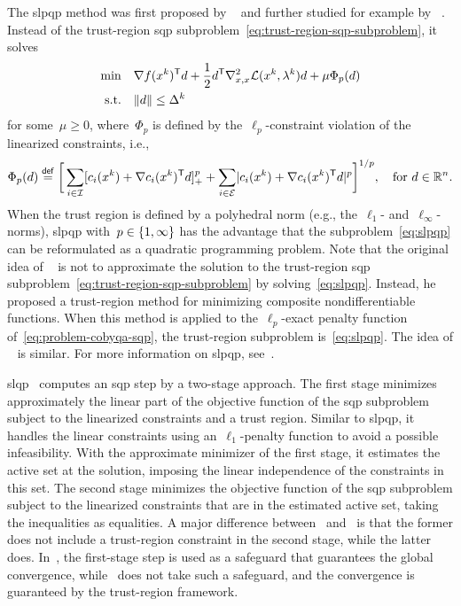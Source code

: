 The \gls{slpqp} method was first proposed by \citeauthor{Fletcher_1982a}~\cite{Fletcher_1982a} and further studied for example by \citeauthor{Yuan_1995}~\cite{Yuan_1995}.
Instead of the trust-region \gls{sqp} subproblem~\cref{eq:trust-region-sqp-subproblem}, it solves
\begin{subequations}
    \label{eq:slpqp}
    \begin{align}
        \min        & \quad \nabla \obj(\iter[k])^{\T} \step + \frac{1}{2} \step^{\T} \nabla_{x, x}^2 \lag(\iter[k], \lm[k]) \step + \mu \Phi_p(d)\\
        \text{s.t.} & \quad \norm{d} \le \rad[k]
    \end{align}
\end{subequations}
for some~$\mu \ge 0$, where~$\Phi_p$ is defined by the~$\ell_p$-constraint violation of the linearized constraints, i.e.,
\begin{equation*}
    \Phi_p(d) \eqdef \bigg[ \sum_{i \in \iub} \posp{\con{i}(\iter[k]) + \nabla \con{i}(\iter[k])^{\T} \step}^p + \sum_{i \in \ieq} \abs{\con{i}(\iter[k]) + \nabla \con{i}(\iter[k])^{\T} \step}^p \bigg]^{1/p}, \quad \text{for~$d \in \R^n$.}
\end{equation*}
When the trust region is defined by a polyhedral norm (e.g., the~$\ell_1$- and~$\ell_{\infty}$-norms), \gls{slpqp} with~$p \in \{1, \infty\}$ has the advantage that the subproblem~\cref{eq:slpqp} can be reformulated as a quadratic programming problem.
Note that the original idea of \citeauthor{Fletcher_1982a}~\cite{Fletcher_1982a} is not to approximate the solution to the trust-region \gls{sqp} subproblem~\cref{eq:trust-region-sqp-subproblem} by solving~\cref{eq:slpqp}.
Instead, he proposed a trust-region method for minimizing composite nondifferentiable functions.
When this method is applied to the~$\ell_p$-exact penalty function of~\cref{eq:problem-cobyqa-sqp}, the trust-region subproblem is~\cref{eq:slpqp}.
The idea of \citeauthor{Yuan_1995}~\cite{Yuan_1995} is similar.
For more information on \gls{slpqp}, see~\cite[\S~8.4.1]{Gould_2021}.

\Gls{slqp}~\cite{Fletcher_Maza_1989,Byrd_Etal_2004} computes an \gls{sqp} step by a two-stage approach.
The first stage minimizes approximately the linear part of the objective function of the \gls{sqp} subproblem subject to the linearized constraints and a trust region.
Similar to \gls{slpqp}, it handles the linear constraints using an~$\ell_1$-penalty function to avoid a possible infeasibility.
With the approximate minimizer of the first stage, it estimates the active set at the solution, imposing the linear independence of the constraints in this set.
The second stage minimizes the objective function of the \gls{sqp} subproblem subject to the linearized constraints that are in the estimated active set, taking the inequalities as equalities.
A major difference between~\cite{Fletcher_Maza_1989} and~\cite{Byrd_Etal_2004} is that the former does not include a trust-region constraint in the second stage, while the latter does.
In~\cite{Fletcher_Maza_1989}, the first-stage step is used as a safeguard that guarantees the global convergence, while~\cite{Byrd_Etal_2004} does not take such a safeguard, and the convergence is guaranteed by the trust-region framework.

